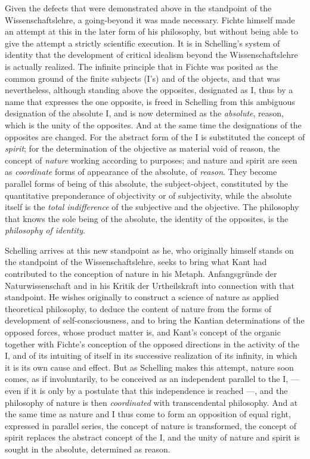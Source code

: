 Given the defects that were demonstrated above in the standpoint of the
Wissenschaftslehre, a going-beyond it was made necessary. Fichte himself
made an attempt at this in the later form of his philosophy, but without
being able to give the attempt a strictly scientific execution. It is in
Schelling's system of identity that the development of
critical idealism beyond the Wissenschaftslehre is actually realized. The
infinite principle that in Fichte was posited as the common ground of the
finite subjects (I's) and of the objects, and that was nevertheless,
although standing above the opposites, designated as I, thus by a name
that expresses the one opposite, is freed in Schelling from this
ambiguous designation of the absolute I, and is now determined as the
\emph{absolute}, reason, which is the unity of the opposites. And at the
same time the designations of the opposites are changed. For the abstract
form of the I is substituted the concept of \emph{spirit}; for the
determination of the objective as material void of reason, the concept of
\emph{nature} working according to purposes; and nature and spirit are
seen as \emph{coordinate} forms of appearance of the absolute, of
\emph{reason}. They become parallel forms of being of this absolute, the
subject-object, constituted by the quantitative preponderance of
objectivity or of subjectivity, while the absolute itself is the
\emph{total indifference} of the subjective and the objective. The
philosophy that knows the sole being of the absolute, the identity of
the opposites, is the \emph{philosophy of identity}.

Schelling arrives at this new standpoint as he, who originally himself
stands on the standpoint of the Wissenschaftslehre, seeks to bring what
Kant had contributed to the conception of nature in his Metaph.
Anfangsgründe der Naturwissenschaft and in his Kritik der Urtheilskraft
into connection with that standpoint. He wishes originally to construct a
science of nature as applied theoretical philosophy, to deduce the
content of nature from the forms of development of self-consciousness,
and to bring the Kantian determinations of the opposed forces, whose
product matter is, and Kant's concept of the organic together with
Fichte's conception of the opposed directions in the activity of the I,
and of its intuiting of itself in its successive realization of its
infinity, in which it is its own cause and effect. But as Schelling makes
this attempt, nature soon comes, as if involuntarily, to be conceived as
an independent parallel to the I, --- even if it is only by a
postulate that this independence is reached ---, and the philosophy of
nature is then \emph{coordinated} with transcendental philosophy. And at
the same time as nature and I thus come to form an opposition of equal
right, expressed in parallel series, the concept of nature is
transformed, the concept of spirit replaces the abstract concept of the
I, and the unity of nature and spirit is sought in the absolute,
determined as reason.

